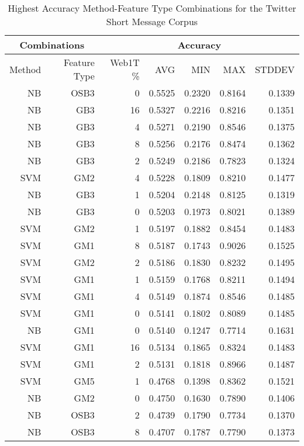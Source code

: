 	
	\begin{table}[htbp!]
	\begin{center}
			\begin{tabular}{ | r | r | r | r | r | r | r | }
			\hline
			\multicolumn{2}{|c|}{Combinations} & \multicolumn{5}{|c|}{Accuracy}\\
			\hline
			Method & Feature Type & Web1T \% & AVG & MIN & MAX & STDDEV\\ \hline 
			NB & OSB3 & 0 & 0.5525 & 0.2320 & 0.8164 & 0.1339\\ \hline 
			NB & GB3 & 16 & 0.5327 & 0.2216 & 0.8216 & 0.1351\\ \hline 
			NB & GB3 & 4 & 0.5271 & 0.2190 & 0.8546 & 0.1375\\ \hline 
			NB & GB3 & 8 & 0.5256 & 0.2176 & 0.8474 & 0.1362\\ \hline 
			NB & GB3 & 2 & 0.5249 & 0.2186 & 0.7823 & 0.1324\\ \hline 
			SVM & GM2 & 4 & 0.5228 & 0.1809 & 0.8210 & 0.1477\\ \hline 
			NB & GB3 & 1 & 0.5204 & 0.2148 & 0.8125 & 0.1319\\ \hline 
			NB & GB3 & 0 & 0.5203 & 0.1973 & 0.8021 & 0.1389\\ \hline 
			SVM & GM2 & 1 & 0.5197 & 0.1882 & 0.8454 & 0.1483\\ \hline 
			SVM & GM1 & 8 & 0.5187 & 0.1743 & 0.9026 & 0.1525\\ \hline 
			SVM & GM2 & 2 & 0.5186 & 0.1830 & 0.8232 & 0.1495\\ \hline 
			SVM & GM1 & 1 & 0.5159 & 0.1768 & 0.8211 & 0.1494\\ \hline 
			SVM & GM1 & 4 & 0.5149 & 0.1874 & 0.8546 & 0.1485\\ \hline 
			SVM & GM1 & 0 & 0.5141 & 0.1802 & 0.8089 & 0.1485\\ \hline 
			NB & GM1 & 0 & 0.5140 & 0.1247 & 0.7714 & 0.1631\\ \hline 
			SVM & GM1 & 16 & 0.5134 & 0.1865 & 0.8324 & 0.1483\\ \hline 
			SVM & GM1 & 2 & 0.5131 & 0.1818 & 0.8966 & 0.1487\\ \hline 
			SVM & GM5 & 1 & 0.4768 & 0.1398 & 0.8362 & 0.1521\\ \hline 
			NB & GM2 & 0 & 0.4750 & 0.1630 & 0.7890 & 0.1406\\ \hline 
			NB & OSB3 & 2 & 0.4739 & 0.1790 & 0.7734 & 0.1370\\ \hline 
			NB & OSB3 & 8 & 0.4707 & 0.1787 & 0.7790 & 0.1373\\ \hline 

			\end{tabular}
		\caption{Highest Accuracy Method-Feature Type Combinations for the Twitter Short Message Corpus}
		\label{tab:twitter-accuracy-filtered-ranked}
		\end{center}	
	\end{table}
	
